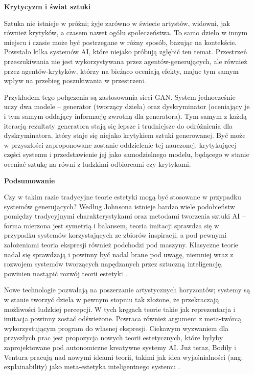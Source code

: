 \documentclass[12pt]{article}
\begin{document}
\noindent\textbf{Krytycyzm i świat sztuki}

Sztuka nie istnieje w próżni; żyje zarówno w świecie artystów, widowni, jak również krytyków, a czasem nawet ogółu społeczeństwa. To samo dzieło w innym miejscu i czasie może być postrzegane w różny sposób, bazując na kontekście. Powstało kilka systemów AI, które niejako próbują zgłębić ten temat. Przestrzeń przeszukiwania nie jest wykorzystywana przez agentów-generujących, ale również przez agentów-krytyków, którzy na bieżąco oceniają efekty, mając tym samym wpływ na przebieg poszukiwania w przestrzeni.

Przykładem tego połączenia są zastosowania sieci GAN. System jednocześnie uczy dwa modele – generator (tworzący dzieła) oraz dyskryminator (oceniający je i tym samym oddający informację zwrotną dla generatora). Tym samym z każdą iteracją rezultaty generatora stają się lepsze i trudniejsze do odróżnienia dla dyskryminatora, który staje się niejako krytykiem sztuki generowanej. Być może w przyszłości zaproponowane zostanie oddzielenie tej nauczonej, krytykującej części systemu i przedstawienie jej jako samodzielnego modelu, będącego w stanie oceniać sztukę na równi z ludzkimi odbiorcami czy krytykami.

\noindent\textbf{Podsumowanie}
\indent

Czy w takim razie tradycyjne teorie estetyki mogą być stosowane w przypadku systemów generujących? Według Johnsona istnieje bardzo wiele podobieństw pomiędzy tradycyjnymi charakterystykami oraz metodami tworzenia sztuki AI – forma mierzona jest symetrią i balansem, teoria imitacji sprawdza się w przypadku systemów korzystających ze zbiorów inspiracji, a pod pewnymi założeniami teoria ekspresji również podchodzi pod maszyny. Klasyczne teorie nadal się sprawdzają i powinny być nadal brane pod uwagę, niemniej wraz z rozwojem systemów tworzących napędzanych przez sztuczną inteligencję, powinien nastąpić rozwój teorii estetyki \cite{1}.

Nowe technologie pozwalają na poszerzanie artystycznych horyzontów; systemy są w stanie tworzyć dzieła w pewnym stopniu tak złożone, że przekraczają możliwości ludzkiej percepcji. W tych kręgach teorie takie jak reprezentacja i imitacja powinny zostać odświeżone. Powraca również argument z meta-twórcą wykorzystującym program do własnej ekspresji. Ciekawym wyzwaniem dla przyszłych prac jest propozycja nowych teorii estetycznych, które byłyby zaprojektowane pod autonomiczne kreatywne systemy AI. Już teraz, Bodily i Ventura pracują nad nowymi ideami teorii, takimi jak idea wyjaśnialności (ang. explainability) jako meta-estetyka inteligentnego systemu \cite{21}.
\end{document}
